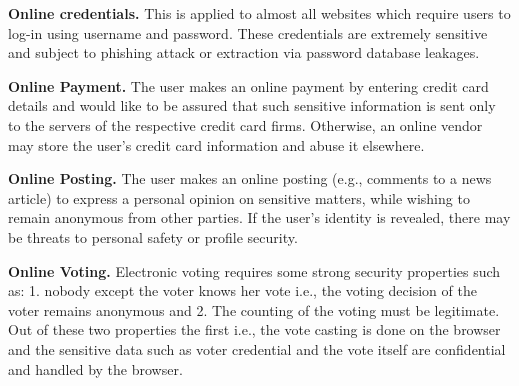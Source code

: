 \textbf{Online credentials.}
This is applied to almost all websites which require users to log-in using
username and password. These credentials are extremely sensitive and subject to
phishing attack or extraction via password database leakages.

\textbf{Online Payment.} 
The user makes an online payment by entering credit card details and would like
to be assured that such sensitive information is sent only to the servers of the
respective credit card firms. Otherwise, an online vendor may store the user's
credit card information and abuse it elsewhere.

\textbf{Online Posting.}
The user makes an online posting (e.g., comments to a news article) to express a
personal opinion on sensitive matters, while wishing to remain anonymous from
other parties. If the user's identity is revealed, there may be threats to
personal safety or profile security.

\textbf{Online Voting.}
Electronic voting requires some strong security properties such as: 1. nobody
except the voter knows her vote i.e., the voting decision of the voter remains
anonymous and 2. The counting of the voting must be legitimate. Out of these two
properties the first i.e., the vote casting is done on the browser and the
sensitive data such as voter credential and the vote itself are confidential and
handled by the browser.
